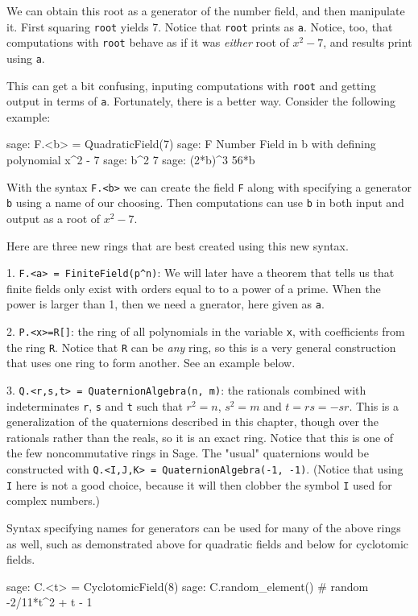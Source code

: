 %
We can obtain this root as a generator of the number field, and then manipulate it.  First squaring \verb?root? yields 7.  Notice that \verb?root? prints as \verb?a?.  Notice, too, that computations with \verb?root? behave as if it was \emph{either} root of $x^2-7$, and results print using \verb?a?.\par
%
This can get a bit confusing, inputing computations with \verb?root? and getting output in terms of \verb?a?.  Fortunately, there is a better way.  Consider the following example:
%
\begin{sageexample}
sage: F.<b> = QuadraticField(7)
sage: F
Number Field in b with defining polynomial x^2 - 7
sage: b^2
7
sage: (2*b)^3
56*b
\end{sageexample}
%
With the syntax \verb?F.<b>? we can create the field \verb?F? along with specifying a generator \verb?b? using a name of our choosing.  Then computations can use \verb?b? in both input and output as a root of $x^2-7$.\par
%
Here are three new rings that are best created using this new syntax.\par
%
1. \verb?F.<a> = FiniteField(p^n)?: We will later have a theorem that tells us that finite fields only exist with orders equal to to a power of a prime.  When the power is larger than 1, then we need a gnerator, here given as \verb?a?.\par
%
2. \verb?P.<x>=R[]?: the ring of all polynomials in the variable \verb?x?, with coefficients from the ring \verb?R?.  Notice that \verb?R? can be \emph{any} ring, so this is a very general construction that uses one ring to form another.  See an example below.\par
%
3. \verb?Q.<r,s,t> = QuaternionAlgebra(n, m)?: the rationals combined with indeterminates \verb?r?, \verb?s? and \verb?t? such that $r^2=n$, $s^2=m$ and $t = rs = -sr$.  This is a generalization of the quaternions described in this chapter, though over the rationals rather than the reals, so it is an exact ring.  Notice that this is one of the few noncommutative rings in Sage.  The "usual" quaternions would be constructed with \verb?Q.<I,J,K> = QuaternionAlgebra(-1, -1)?.  (Notice that using \verb?I? here is not a good choice, because it will then clobber the symbol \verb?I? used for complex numbers.)
\par
%
Syntax specifying names for generators can be used for many of the above rings as well, such as demonstrated above for quadratic fields and below for cyclotomic fields.
%
\begin{sageexample}
sage: C.<t> = CyclotomicField(8)
sage: C.random_element()  # random
-2/11*t^2 + t - 1
\end{sageexample}
